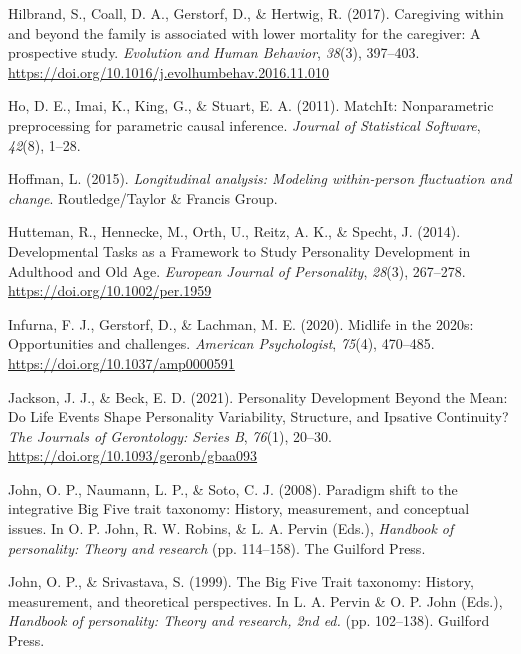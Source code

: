 \documentclass[
  english,
  man, noextraspace]{apa7}
\begin{document}
\leavevmode\hypertarget{ref-hilbrandCaregivingFamilyAssociated2017}{}%
Hilbrand, S., Coall, D. A., Gerstorf, D., \& Hertwig, R. (2017). Caregiving within and beyond the family is associated with lower mortality for the caregiver: A prospective study. \emph{Evolution and Human Behavior}, \emph{38}(3), 397--403. \url{https://doi.org/10.1016/j.evolhumbehav.2016.11.010}

\leavevmode\hypertarget{ref-MatchIt2011}{}%
Ho, D. E., Imai, K., King, G., \& Stuart, E. A. (2011). MatchIt: Nonparametric preprocessing for parametric causal inference. \emph{Journal of Statistical Software}, \emph{42}(8), 1--28.

\leavevmode\hypertarget{ref-hoffmanLongitudinalAnalysisModeling2015}{}%
Hoffman, L. (2015). \emph{Longitudinal analysis: Modeling within-person fluctuation and change}. Routledge/Taylor \& Francis Group.

\leavevmode\hypertarget{ref-huttemanDevelopmentalTasksFramework2014}{}%
Hutteman, R., Hennecke, M., Orth, U., Reitz, A. K., \& Specht, J. (2014). Developmental Tasks as a Framework to Study Personality Development in Adulthood and Old Age. \emph{European Journal of Personality}, \emph{28}(3), 267--278. \url{https://doi.org/10.1002/per.1959}

\leavevmode\hypertarget{ref-infurnaMidlife2020sOpportunities2020}{}%
Infurna, F. J., Gerstorf, D., \& Lachman, M. E. (2020). Midlife in the 2020s: Opportunities and challenges. \emph{American Psychologist}, \emph{75}(4), 470--485. \url{https://doi.org/10.1037/amp0000591}

\leavevmode\hypertarget{ref-jacksonPersonalityDevelopmentMean2021}{}%
Jackson, J. J., \& Beck, E. D. (2021). Personality Development Beyond the Mean: Do Life Events Shape Personality Variability, Structure, and Ipsative Continuity? \emph{The Journals of Gerontology: Series B}, \emph{76}(1), 20--30. \url{https://doi.org/10.1093/geronb/gbaa093}

\leavevmode\hypertarget{ref-johnParadigmShiftIntegrative2008}{}%
John, O. P., Naumann, L. P., \& Soto, C. J. (2008). Paradigm shift to the integrative Big Five trait taxonomy: History, measurement, and conceptual issues. In O. P. John, R. W. Robins, \& L. A. Pervin (Eds.), \emph{Handbook of personality: Theory and research} (pp. 114--158). The Guilford Press.

\leavevmode\hypertarget{ref-johnBigFiveTrait1999}{}%
John, O. P., \& Srivastava, S. (1999). The Big Five Trait taxonomy: History, measurement, and theoretical perspectives. In L. A. Pervin \& O. P. John (Eds.), \emph{Handbook of personality: Theory and research, 2nd ed.} (pp. 102--138). Guilford Press.
\end{document}
